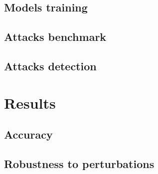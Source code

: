 \documentclass[11pt,twocolumn,letterpaper]{article}
\begin{document}
\paragraph{} 

\subsection{Models training}

\paragraph{} 

\subsection{Attacks benchmark}

\paragraph{} 

\subsection{Attacks detection}

\paragraph{}


\section{Results}
\label{sec:results}

\subsection{Accuracy}

\paragraph{} 

\subsection{Robustness to perturbations}

\paragraph{} 
\end{document}
